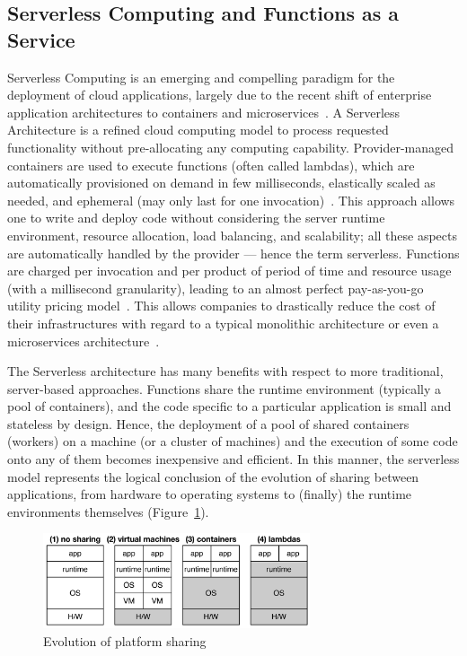 \subsection{Serverless Computing and Functions as a Service}

Serverless Computing is an emerging and compelling paradigm for the deployment of cloud applications, largely due to the recent shift of enterprise application architectures to containers and microservices~\cite{baldini2017serverless}.  A Serverless Architecture is a refined cloud computing model to process requested functionality without pre-allocating any computing capability. Provider-managed containers are used to execute functions (often called lambdas), which are automatically provisioned on demand in few milliseconds, elastically scaled as needed, and ephemeral (may only last for one invocation)~\cite{Roberts2016serverless}. This approach allows one to write and deploy code without considering the server runtime
environment, resource allocation, load balancing, and scalability; all these aspects are automatically handled by the provider --- hence the term serverless. Functions are charged per invocation and per product of period of time and resource usage (with a millisecond granularity), leading to an almost perfect pay-as-you-go utility pricing model~\cite{MateosFaaster17}.  This allows companies to drastically reduce the cost of their infrastructures with regard to a typical monolithic architecture or even a microservices architecture~\cite{Villamizar2017lambda}.

The Serverless architecture has many benefits with respect to more traditional, server-based approaches. Functions share the runtime environment (typically a pool of containers), and the code specific to a particular application is small and stateless by design. Hence, the deployment of a pool of shared containers (workers) on a machine (or a cluster of machines) and the execution of some code onto any of them becomes inexpensive and efficient. In this manner, the serverless model represents the logical conclusion of the evolution of sharing between applications, from hardware to operating systems to (finally) the runtime environments themselves (Figure~\ref{fig:Evolution-of-Sharing}).

\begin{figure}
  \centering
    \includegraphics[width=0.7\textwidth]{figs/evolution-platform-sharing.png}    
    \caption{Evolution of platform sharing~\cite{Hendrickson:2016}}
    \label{fig:Evolution-of-Sharing}
\end{figure}


